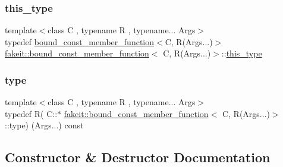 \subsubsection{\texorpdfstring{this\_type}{this\_type}}
{\footnotesize\ttfamily template$<$class C , typename R , typename... Args$>$ \\
typedef \mbox{\hyperlink{classfakeit_1_1bound__const__member__function}{bound\+\_\+const\+\_\+member\+\_\+function}}$<$C, R(Args...)$>$ \mbox{\hyperlink{classfakeit_1_1bound__const__member__function}{fakeit\+::bound\+\_\+const\+\_\+member\+\_\+function}}$<$ C, R(Args...)$>$\+::\mbox{\hyperlink{classfakeit_1_1bound__const__member__function_3_01C_00_01R_07Args_8_8_8_08_4_abd7a4a6a7f91724a7279dce10ce7941a}{this\+\_\+type}}}

\mbox{\label{classfakeit_1_1bound__const__member__function_3_01C_00_01R_07Args_8_8_8_08_4_a0226a7415039666838a9beafb0acc657}} 
\subsubsection{\texorpdfstring{type}{type}}
{\footnotesize\ttfamily template$<$class C , typename R , typename... Args$>$ \\
typedef R( C\+::$\ast$ \mbox{\hyperlink{classfakeit_1_1bound__const__member__function}{fakeit\+::bound\+\_\+const\+\_\+member\+\_\+function}}$<$ C, R(Args...)$>$\+::type) (Args...) const}



\subsection{Constructor \& Destructor Documentation}
\mbox{\label{classfakeit_1_1bound__const__member__function_3_01C_00_01R_07Args_8_8_8_08_4_ab2bc42d6547a8e128d9d643b98c72601}} 
